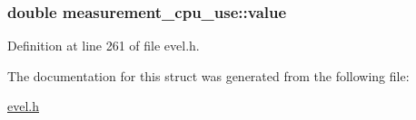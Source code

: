 \subsubsection[{value}]{\setlength{\rightskip}{0pt plus 5cm}double measurement\+\_\+cpu\+\_\+use\+::value}\label{structmeasurement__cpu__use_adbd49f71fba95c7c1c06caf1d443ce47}


Definition at line 261 of file evel.\+h.



The documentation for this struct was generated from the following file\+:\begin{DoxyCompactItemize}
\item 
\hyperlink{evel_8h}{evel.\+h}\end{DoxyCompactItemize}
